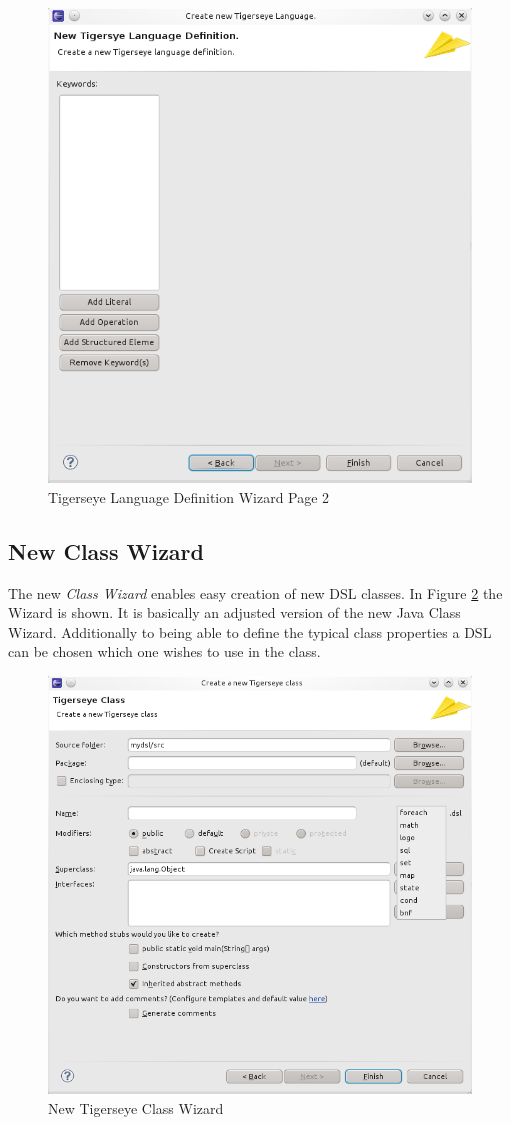 	\begin{figure}
	  \centering
	  \includegraphics[width=.5\textwidth,keepaspectratio=true]{./pics/tigerseye_language_definition_page2.png}
	  \caption{Tigerseye Language Definition Wizard Page 2}
	  \label{fig:tiger_lang_definition_page2}
	\end{figure}
	
	\subsection{New \tiger Class Wizard}
	  The new \emph{\tiger Class Wizard} enables easy creation of new DSL classes. In Figure \ref{fig:new_tiger_class_page} the Wizard is shown. It is basically an adjusted version of the new Java Class Wizard. Additionally to being able to define the typical class properties a DSL can be chosen which one wishes to use in the class.

	\begin{figure}
	  \centering
	  \includegraphics[width=.5\textwidth]{./pics/new_tigerseye_class_wizard.png}
	  \caption{New Tigerseye Class Wizard}
	  \label{fig:new_tiger_class_page}
	\end{figure}	
	
